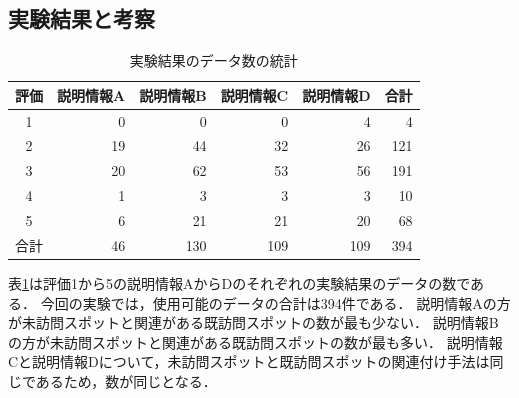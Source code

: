 \documentclass{deimj}
\begin{document}
\subsection{実験結果と考察}
\label{subsec:実験結果}

\begin{table}[t]
  \caption{実験結果のデータ数の統計}
  \label{table:実験結果のデータ数の統計}
  \centering
  \begin{tabular}{c|r|r|r|r|r}
  \hline
  評価 & \multicolumn{1}{c|}{説明情報A} & \multicolumn{1}{c|}{説明情報B} & \multicolumn{1}{c|}{説明情報C} & \multicolumn{1}{c|}{説明情報D} & \multicolumn{1}{c}{合計} \\ \hline
  1  & 0                      & 0                      & 0                      & 4                      & 4                      \\
  2  & 19                     & 44                     & 32                     & 26                     & 121                    \\
  3  & 20                     & 62                     & 53                     & 56                     & 191                    \\
  4  & 1                      & 3                      & 3                      & 3                      & 10                     \\
  5  & 6                      & 21                     & 21                     & 20                     & 68                     \\\hline
  合計 & 46                     & 130                    & 109                    & 109                    & 394                    \\ \hline
  \end{tabular}
\end{table}

表\ref{table:実験結果のデータ数の統計}は評価1から5の説明情報AからDのそれぞれの実験結果のデータの数である．
今回の実験では，使用可能のデータの合計は394件である．
説明情報Aの方が未訪問スポットと関連がある既訪問スポットの数が最も少ない．
説明情報Bの方が未訪問スポットと関連がある既訪問スポットの数が最も多い．
説明情報Cと説明情報Dについて，未訪問スポットと既訪問スポットの関連付け手法は同じであるため，数が同じとなる．
\end{document}
